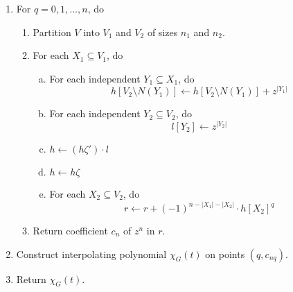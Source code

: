 \documentclass[a4paper]{article}
\begin{document}
 \begin{enumerate}[{Step} A.]
\item \label{q} For $q = 0, 1, \ldots, n$, do
\begin{enumerate}[1.]
  \item Partition $V$ into $V_1$ and $V_2$ of sizes $n_1$ and $n_2$.
  \item \label{step1} For each $X_1 \subseteq V_1$, do
  \begin{enumerate}[a)]
  \item \label{indep1} For each independent $Y_1 \subseteq X_1$, do
\[ h[V_2 \setminus N(Y_1)] \leftarrow h[V_2 \setminus N(Y_1)] + z^{|Y_1|} \]
  \item \label{indep2} For each independent $Y_2 \subseteq V_2$, do
\[ l[Y_2] \leftarrow z^{|Y_2|} \]
  \item \label{multi} $h \leftarrow (h\zeta')\cdot l$
  \item $h \leftarrow h\zeta$
  \item \label{rstep}For each $X_2 \subseteq V_2$, do
\[ r \leftarrow r + (-1)^{n - |X_1| - |X_2|}\cdot h[X_2]^q \]
  \end{enumerate}
  \item Return coefficient $c_n$ of $z^n$ in $r$.
\end{enumerate}
\item Construct interpolating polynomial $\chi_G(t)$ on points $(q, c_{nq})$.
\item Return $\chi_G(t)$.
\end{enumerate}
\end{document}
